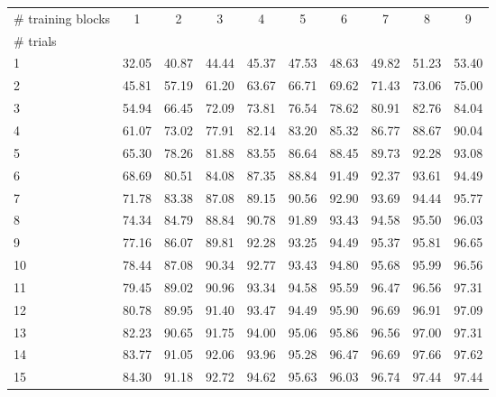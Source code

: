 \begin{tabular}{@{}lccccccccc@{}}
\toprule
\# training blocks & 1 & 2 & 3 & 4 & 5 & 6 & 7 & 8 & 9 \\
\# trials &  &  &  &  &  &  &  &  &  \\
\midrule
1 & 32.05 & 40.87 & 44.44 & 45.37 & 47.53 & 48.63 & 49.82 & 51.23 & 53.40 \\
2 & 45.81 & 57.19 & 61.20 & 63.67 & 66.71 & 69.62 & 71.43 & 73.06 & 75.00 \\
3 & 54.94 & 66.45 & 72.09 & 73.81 & 76.54 & 78.62 & 80.91 & 82.76 & 84.04 \\
4 & 61.07 & 73.02 & 77.91 & 82.14 & 83.20 & 85.32 & 86.77 & 88.67 & 90.04 \\
5 & 65.30 & 78.26 & 81.88 & 83.55 & 86.64 & 88.45 & 89.73 & 92.28 & 93.08 \\
6 & 68.69 & 80.51 & 84.08 & 87.35 & 88.84 & 91.49 & 92.37 & 93.61 & 94.49 \\
7 & 71.78 & 83.38 & 87.08 & 89.15 & 90.56 & 92.90 & 93.69 & 94.44 & 95.77 \\
8 & 74.34 & 84.79 & 88.84 & 90.78 & 91.89 & 93.43 & 94.58 & 95.50 & 96.03 \\
9 & 77.16 & 86.07 & 89.81 & 92.28 & 93.25 & 94.49 & 95.37 & 95.81 & 96.65 \\
10 & 78.44 & 87.08 & 90.34 & 92.77 & 93.43 & 94.80 & 95.68 & 95.99 & 96.56 \\
11 & 79.45 & 89.02 & 90.96 & 93.34 & 94.58 & 95.59 & 96.47 & 96.56 & 97.31 \\
12 & 80.78 & 89.95 & 91.40 & 93.47 & 94.49 & 95.90 & 96.69 & 96.91 & 97.09 \\
13 & 82.23 & 90.65 & 91.75 & 94.00 & 95.06 & 95.86 & 96.56 & 97.00 & 97.31 \\
14 & 83.77 & 91.05 & 92.06 & 93.96 & 95.28 & 96.47 & 96.69 & 97.66 & 97.62 \\
15 & 84.30 & 91.18 & 92.72 & 94.62 & 95.63 & 96.03 & 96.74 & 97.44 & 97.44 \\
\bottomrule
\end{tabular}
